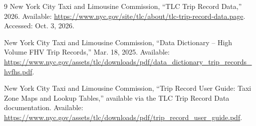 \documentclass[10pt,a4paper]{article}
\begin{document}
\begin{thebibliography}{9}
New York City Taxi and Limousine Commission, ``TLC Trip Record Data,'' 2026. Available: \url{https://www.nyc.gov/site/tlc/about/tlc-trip-record-data.page}. Accessed: Oct. 3, 2026.

New York City Taxi and Limousine Commission, ``Data Dictionary -- High Volume FHV Trip Records,'' Mar. 18, 2025. Available: \url{https://www.nyc.gov/assets/tlc/downloads/pdf/data_dictionary_trip_records_hvfhs.pdf}.

New York City Taxi and Limousine Commission, ``Trip Record User Guide: Taxi Zone Maps and Lookup Tables,'' available via the TLC Trip Record Data documentation. Available: \url{https://www.nyc.gov/assets/tlc/downloads/pdf/trip_record_user_guide.pdf}.
\end{thebibliography}
\end{document}
